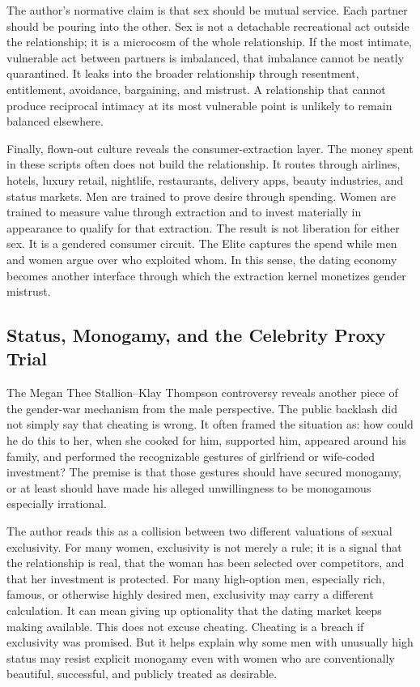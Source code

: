 \documentclass[12pt]{article}
\begin{document}
The author's normative claim is that sex should be mutual service. Each partner should be pouring into the other. Sex is not a detachable recreational act outside the relationship; it is a microcosm of the whole relationship. If the most intimate, vulnerable act between partners is imbalanced, that imbalance cannot be neatly quarantined. It leaks into the broader relationship through resentment, entitlement, avoidance, bargaining, and mistrust. A relationship that cannot produce reciprocal intimacy at its most vulnerable point is unlikely to remain balanced elsewhere.

Finally, flown-out culture reveals the consumer-extraction layer. The money spent in these scripts often does not build the relationship. It routes through airlines, hotels, luxury retail, nightlife, restaurants, delivery apps, beauty industries, and status markets. Men are trained to prove desire through spending. Women are trained to measure value through extraction and to invest materially in appearance to qualify for that extraction. The result is not liberation for either sex. It is a gendered consumer circuit. The Elite captures the spend while men and women argue over who exploited whom. In this sense, the dating economy becomes another interface through which the extraction kernel monetizes gender mistrust.

\subsection{Status, Monogamy, and the Celebrity Proxy Trial}

The Megan Thee Stallion--Klay Thompson controversy reveals another piece of the gender-war mechanism from the male perspective. The public backlash did not simply say that cheating is wrong. It often framed the situation as: how could he do this to her, when she cooked for him, supported him, appeared around his family, and performed the recognizable gestures of girlfriend or wife-coded investment? The premise is that those gestures should have secured monogamy, or at least should have made his alleged unwillingness to be monogamous especially irrational.

The author reads this as a collision between two different valuations of sexual exclusivity. For many women, exclusivity is not merely a rule; it is a signal that the relationship is real, that the woman has been selected over competitors, and that her investment is protected. For many high-option men, especially rich, famous, or otherwise highly desired men, exclusivity may carry a different calculation. It can mean giving up optionality that the dating market keeps making available. This does not excuse cheating. Cheating is a breach if exclusivity was promised. But it helps explain why some men with unusually high status may resist explicit monogamy even with women who are conventionally beautiful, successful, and publicly treated as desirable.
\end{document}
